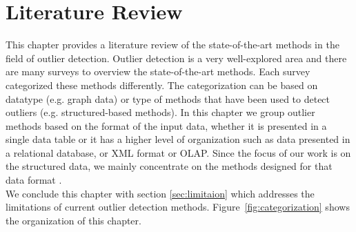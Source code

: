 
%
%

\chapter{Literature Review}
\label{chap:two}
This chapter provides a literature review of the state-of-the-art methods in the field of outlier detection. 
Outlier detection is a very well-explored area and there are many surveys to overview the state-of-the-art methods. Each survey categorized these methods differently. The categorization can be based on datatype (e.g. graph data) or type of methods that have been used to detect outliers (e.g. structured-based methods). In this chapter we group outlier methods based on the format of the input data, whether it is presented in a single data table or it has a higher level of organization such as data presented in a relational database, or XML format or OLAP. Since the focus of our work is on the structured data, we mainly concentrate on the methods designed for that data format .\\%
 We conclude this chapter with section \ref{sec:limitaion} which addresses the limitations of current outlier detection methods. Figure~\ref{fig:categorization} shows the organization of this chapter.
